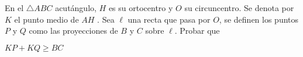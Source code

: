 
\begin{problem}
	En el $\triangle ABC$ acutángulo, $H$ es su ortocentro y $O$ su circuncentro. Se denota por $K$ el punto medio de $AH$ . Sea $\ell$ una recta que pasa por $O$, se definen los puntos $P$ y $Q$ como las proyecciones de $B$ y $C$ sobre $\ell$. Probar que 
	\begin{center}
		$KP+KQ \ge BC$
	\end{center}
\end{problem}
